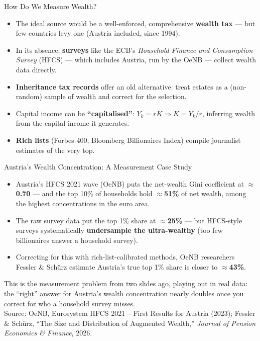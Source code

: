 \documentclass[11pt,aspectratio=169]{beamer}
\newcommand{\srcnote}[1]{{\footnotesize\color{wugray}Source: #1}}
\begin{document}
\begin{frame}{How Do We Measure Wealth?}
  \footnotesize
  \begin{itemize}
    \item The ideal source would be a well-enforced, comprehensive \textbf{wealth tax} --- but few countries levy one (Austria included, since 1994).
    \item In its absence, \textbf{surveys} like the ECB's \emph{Household Finance and Consumption Survey} (HFCS) --- which includes Austria, run by the OeNB --- collect wealth data directly.
    \item \textbf{Inheritance tax records} offer an old alternative: treat estates as a (non-random) sample of wealth and correct for the selection.
    \item Capital income can be \textbf{``capitalised''}: $Y_k = rK \Rightarrow K = Y_k/r$, inferring wealth from the capital income it generates.
    \item \textbf{Rich lists} (Forbes 400, Bloomberg Billionaires Index) compile journalist estimates of the very top.
  \end{itemize}
\end{frame}

\begin{frame}{Austria's Wealth Concentration: A Measurement Case Study}
  \small
  \begin{itemize}
    \item Austria's HFCS 2021 wave (OeNB) puts the net-wealth Gini coefficient at \(\approx\)\textbf{0.70} --- and the top 10\% of households hold \(\approx\)\textbf{51\%} of net wealth, among the highest concentrations in the euro area.
    \item The raw survey data put the top 1\% share at \(\approx\)\textbf{25\%} --- but HFCS-style surveys systematically \textbf{undersample the ultra-wealthy} (too few billionaires answer a household survey).
    \item Correcting for this with rich-list-calibrated methods, OeNB researchers Fessler \& Schürz estimate Austria's true top 1\% share is closer to \(\approx\)\textbf{43\%}.
  \end{itemize}
  \vspace{0.3em}
  \centering
  This is the measurement problem from two slides ago, playing out in real data: the ``right'' answer for Austria's wealth concentration nearly doubles once you correct for who a household survey misses.\\
  \srcnote{OeNB, Eurosystem HFCS 2021 -- First Results for Austria (2023); Fessler \& Schürz, ``The Size and Distribution of Augmented Wealth,'' \emph{Journal of Pension Economics \& Finance}, 2026.}
\end{frame}
\end{document}
